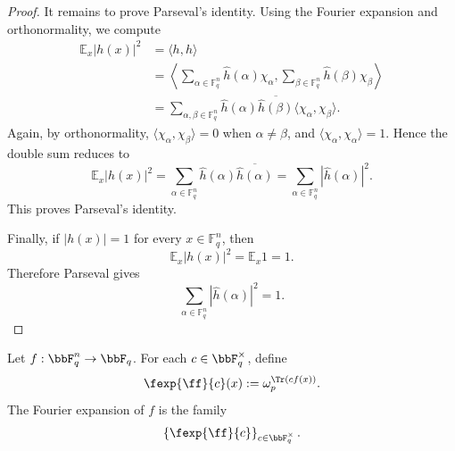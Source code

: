 \begin{proof}
It remains to prove Parseval's identity. Using the Fourier expansion and
orthonormality, we compute
\[
\begin{aligned}
    \mathbb E_x |h(x)|^2
    &= \langle h,h\rangle \\
    &=
    \left\langle
        \sum_{\alpha\in\mathbb F_q^n}
            \widehat h(\alpha)\chi_\alpha,
        \sum_{\beta\in\mathbb F_q^n}
            \widehat h(\beta)\chi_\beta
    \right\rangle \\
    &=
    \sum_{\alpha,\beta\in\mathbb F_q^n}
        \widehat h(\alpha)
        \overline{\widehat h(\beta)}
        \langle \chi_\alpha,\chi_\beta\rangle .
\end{aligned}
\]
Again, by orthonormality,
\(\langle \chi_\alpha,\chi_\beta\rangle=0\) when \(\alpha\neq\beta\), and
\(\langle \chi_\alpha,\chi_\alpha\rangle=1\). Hence the double sum reduces to
\[
    \mathbb E_x |h(x)|^2
    =
    \sum_{\alpha\in\mathbb F_q^n}
        \widehat h(\alpha)\overline{\widehat h(\alpha)}
    =
    \sum_{\alpha\in\mathbb F_q^n}
        |\widehat h(\alpha)|^2 .
\]
This proves Parseval's identity.

Finally, if \(|h(x)|=1\) for every \(x\in\mathbb F_q^n\), then
\[
    \mathbb E_x |h(x)|^2 = \mathbb E_x 1 = 1.
\]
Therefore Parseval gives
\[
    \sum_{\alpha\in\mathbb F_q^n} |\widehat h(\alpha)|^2 = 1.
\]
\end{proof}

\begin{definition}
\label{def:fourier-expansion-field-valued}
Let $f:\bbF_q^n\to\bbF_q$. For each $c\in\bbF_q^\times$, define
\[
    \fexp{\ff}{c}(x) := \omega_p^{\Tr(c f(x))}.
\]
The Fourier expansion of $f$ is the family
\[
    \left\{\fexp{\ff}{c}\right\}_{c\in\bbF_q^\times}.
\]
\end{definition}

